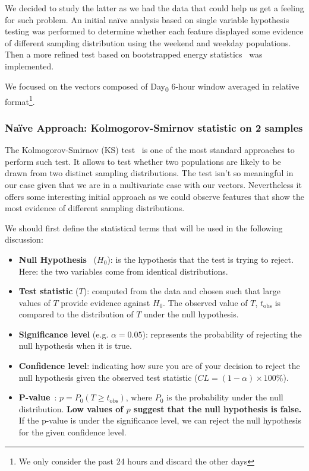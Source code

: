 We decided to study the latter as we had the data that could help us get a feeling for such problem. An initial naïve analysis based on single variable hypothesis testing was performed to determine whether each feature displayed some evidence of different sampling distribution using the weekend and weekday populations. Then a more refined test based on bootstrapped energy statistics~\cite{energy_test} was implemented. 

We focused on the vectors composed of Day\textsubscript{0} 6-hour window averaged in relative format\footnote{We only consider the past 24 hours and discard the other days}.

\subsubsection{Naïve Approach: Kolmogorov-Smirnov statistic on 2 samples}
The Kolmogorov-Smirnov (KS) test~\cite{wiki:ks_test} is one of the most standard approaches to perform such test. It allows to test whether two populations are likely to be drawn from two distinct sampling distributions. The test isn't so meaningful in our case given that we are in a multivariate case with our vectors. Nevertheless it offers some interesting initial approach as we could observe features that show the most evidence of different sampling distributions.

We should first define the statistical terms that will be used in the following discussion:
\begin{itemize}[noitemsep,topsep=0pt]
	\item \textbf{Null Hypothesis}~\cite{wiki:null_hyp} ($H_0$): is the hypothesis that the test is trying to reject. Here: the two variables come from identical distributions.
	\item \textbf{Test statistic} ($T$): computed from the data and chosen such that large values of $T$ provide evidence against $H_0$. The observed value of $T$, $t_\text{obs}$ is compared to the distribution of $T$ under the null hypothesis. 
	\item \textbf{Significance level} (e.g. $\alpha = 0.05$): represents the probability of rejecting the null hypothesis when it is true. 
	\item \textbf{Confidence level}: indicating how sure you are of your decision to reject the null hypothesis given the observed test statistic ($CL = (1 -\alpha)\times 100\%$).
	\item \textbf{P-value}~\cite{wiki:pvalue}: $p=P_0(T \ge t_\text{obs})$, where $P_0$ is the probability under the null distribution. \textbf{Low values of $p$ suggest that the null hypothesis is false.} If the p-value is under the significance level, we can reject the null hypothesis for the given confidence level.
\end{itemize}

